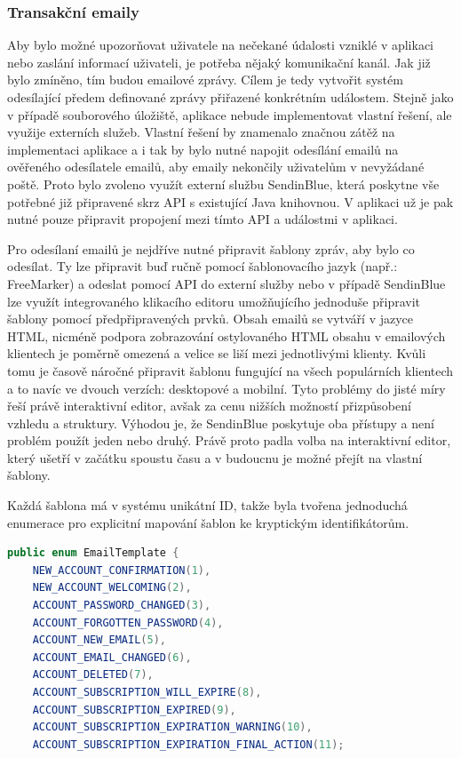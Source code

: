 \begin{itemize}
\begin{itemize}
		\subsubsection{Transakční emaily}

		Aby bylo možné upozorňovat uživatele na nečekané údalosti vzniklé v aplikaci nebo zaslání informací uživateli,
		je potřeba nějaký komunikační kanál.
		Jak již bylo zmíněno, tím budou emailové zprávy.
		Cílem je tedy vytvořit systém odesílající předem definované zprávy přiřazené konkrétním událostem.
		Stejně jako v případě souborového úložiště, aplikace nebude implementovat vlastní řešení, ale využije externích
		služeb.
		Vlastní řešení by znamenalo značnou zátěž na implementaci aplikace a i tak by bylo nutné napojit odesílání
		emailů na ověřeného odesílatele emailů, aby emaily nekončily uživatelům v nevyžádané poště.
		Proto bylo zvoleno využít externí službu SendinBlue, která poskytne vše potřebné již připravené skrz \ac{API}
		s existující Java knihovnou.
		V aplikaci už je pak nutné pouze připravit propojení mezi tímto \ac{API} a událostmi v aplikaci.

		Pro odesílaní emailů je nejdříve nutné připravit šablony zpráv, aby bylo co odesílat.
		Ty lze připravit buď ručně pomocí šablonovacího jazyk (např.: FreeMarker) a odeslat pomocí \ac{API} do externí
		služby nebo v případě SendinBlue lze využít integrovaného klikacího editoru umožňujícího jednoduše připravit
		šablony pomocí předpřipravených prvků.
		Obsah emailů se vytváří v jazyce \ac{HTML}, nicméně podpora zobrazování ostylovaného \ac{HTML} obsahu v
		emailových klientech je poměrně omezená a velice se liší mezi jednotlivými klienty.
		Kvůli tomu je časově náročné připravit šablonu fungující na všech populárních klientech a to navíc ve dvouch
		verzích: desktopové a mobilní.
		Tyto problémy do jisté míry řeší právě interaktivní editor, avšak za cenu nižších možností přizpůsobení vzhledu
		a struktury.
		Výhodou je, že SendinBlue poskytuje oba přístupy a není problém použít jeden nebo druhý.
		Právě proto padla volba na interaktivní editor, který ušetří v začátku spoustu času a v budoucnu je možné
		přejít na vlastní šablony.

		Každá šablona má v systému unikátní ID, takže byla tvořena jednoduchá enumerace pro explicitní mapování
		šablon ke kryptickým identifikátorům.
		\begin{lstlisting}[language=Java]
public enum EmailTemplate {
    NEW_ACCOUNT_CONFIRMATION(1),
    NEW_ACCOUNT_WELCOMING(2),
    ACCOUNT_PASSWORD_CHANGED(3),
    ACCOUNT_FORGOTTEN_PASSWORD(4),
    ACCOUNT_NEW_EMAIL(5),
    ACCOUNT_EMAIL_CHANGED(6),
    ACCOUNT_DELETED(7),
    ACCOUNT_SUBSCRIPTION_WILL_EXPIRE(8),
    ACCOUNT_SUBSCRIPTION_EXPIRED(9),
    ACCOUNT_SUBSCRIPTION_EXPIRATION_WARNING(10),
    ACCOUNT_SUBSCRIPTION_EXPIRATION_FINAL_ACTION(11);


\end{lstlisting}
\end{itemize}
\end{itemize}
